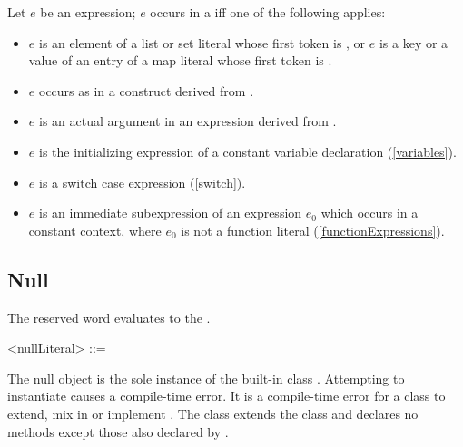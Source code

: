 \documentclass[makeidx]{article}
\begin{document}
{\LMHash{}%
Let $e$ be an expression; $e$ occurs in a
if{}f one of the following applies:


\begin{itemize}
\item $e$ is an element of a list or set literal whose first token is \CONST,
  or $e$ is a key or a value of an entry
  of a map literal whose first token is \CONST.
\item $e$ occurs as  in a construct derived from .
\item $e$ is an actual argument in an expression derived from
  .
\item $e$ is the initializing expression of a constant variable declaration
  (\ref{variables}).
\item $e$ is a switch case expression
  (\ref{switch}).
\item $e$ is an immediate subexpression of
  an expression $e_0$ which occurs in a constant context,
  where $e_0$ is
  not a function literal
  (\ref{functionExpressions}).
\end{itemize}



\subsection{Null}

\LMHash{}%
The reserved word \NULL{} evaluates to the .

\begin{grammar}
<nullLiteral> ::= \NULL{}
\end{grammar}

\LMHash{}%
The null object is the sole instance of the built-in class .
Attempting to instantiate  causes a compile-time error.
It is a compile-time error for a class to extend, mix in or implement
.
The  class extends the  class
and declares no methods except those also declared by .

}
\end{document}
